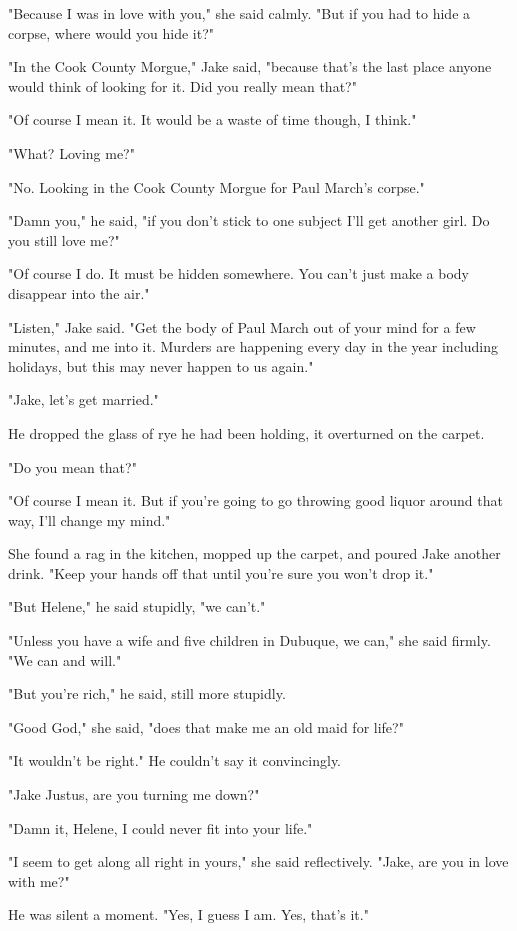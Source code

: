 \documentclass{novel}
\begin{document}
"Because I was in love with you," she said calmly. "But if you had to hide a corpse, where would you hide it?"

"In the Cook County Morgue," Jake said, "because that's the last place anyone would think of looking for it. Did you really mean that?"

"Of course I mean it. It would be a waste of time though, I think."

"What? Loving me?"

"No. Looking in the Cook County Morgue for Paul March's corpse."

"Damn you," he said, "if you don't stick to one subject I'll get another girl. Do you still love me?"

"Of course I do. It must be hidden somewhere. You can't just make a body disappear into the air."

"Listen," Jake said. "Get the body of Paul March out of your mind for a few minutes, and me into it. Murders are happening every day in the year including holidays, but this may never happen to us again."

"Jake, let's get married."

He dropped the glass of rye he had been holding, it overturned on the carpet.

"Do you mean that?"

"Of course I mean it. But if you're going to go throwing good liquor around that way, I'll change my mind."

She found a rag in the kitchen, mopped up the carpet, and poured Jake another drink. "Keep your hands off that until you're sure you won't drop it."

"But Helene," he said stupidly, "we can't."

"Unless you have a wife and five children in Dubuque, we can," she said firmly. "We can and will."

"But you're rich," he said, still more stupidly.

"Good God," she said, "does that make me an old maid for life?"

"It wouldn't be right." He couldn't say it convincingly.

"Jake Justus, are you turning me down?"

"Damn it, Helene, I could never fit into your life."

"I seem to get along all right in yours," she said reflectively. "Jake, are you in love with me?"

He was silent a moment. "Yes, I guess I am. Yes, that's it."
\end{document}
